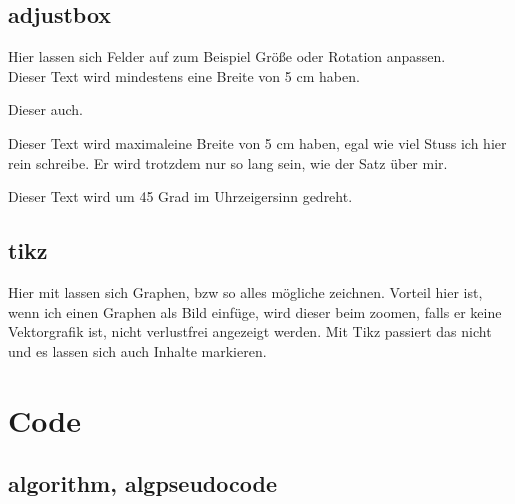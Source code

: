 \subsection{adjustbox}

Hier lassen sich Felder auf zum Beispiel Größe oder Rotation anpassen. \\

\begin{adjustbox}{min width=5cm}
    Dieser Text wird mindestens eine Breite von 5 cm haben.
\end{adjustbox}

\begin{adjustbox}{min width=5cm}
    Dieser auch.
\end{adjustbox}

\begin{adjustbox}{max width=5cm}
    Dieser Text wird maximaleine Breite von 5 cm haben, egal wie viel Stuss ich hier rein schreibe. Er wird trotzdem nur so lang sein, wie der Satz über mir.
\end{adjustbox}

\begin{adjustbox}{rotate=45}
    Dieser Text wird um 45 Grad im Uhrzeigersinn gedreht.
\end{adjustbox}
\newpage

\subsection{tikz}

Hier mit lassen sich Graphen, bzw so alles mögliche zeichnen. Vorteil hier ist, wenn ich einen Graphen als Bild einfüge, wird dieser beim zoomen, falls er keine Vektorgrafik ist, nicht verlustfrei angezeigt werden. Mit Tikz passiert das nicht und es lassen sich auch Inhalte markieren.



\section{Code}
\subsection{algorithm, algpseudocode}


